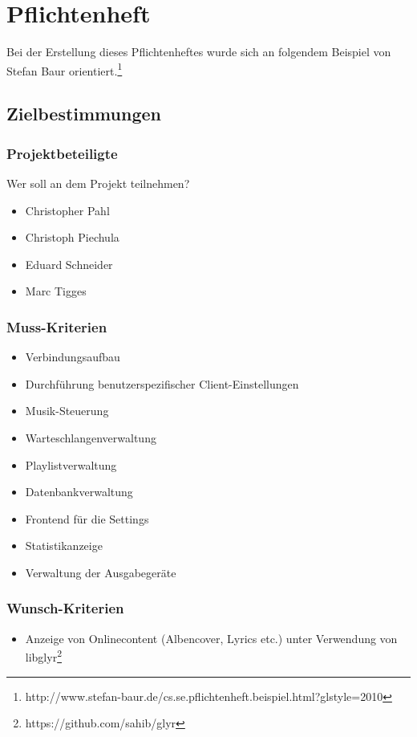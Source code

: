 \chapter{Pflichtenheft}
Bei der Erstellung dieses Pflichtenheftes wurde sich an folgendem Beispiel von Stefan Baur orientiert.\footnote{http://www.stefan-baur.de/cs.se.pflichtenheft.beispiel.html?glstyle=2010}

\section{Zielbestimmungen}
\subsection{Projektbeteiligte}
Wer soll an dem Projekt teilnehmen?
\begin{itemize}
        \item Christopher Pahl
        \item Christoph Piechula
        \item Eduard Schneider
        \item Marc Tigges
\end{itemize}
\subsection{Muss-Kriterien}
\renewcommand{\labelitemi}{•}
\begin{itemize}
	\item Verbindungsaufbau
	\item Durchführung benutzerspezifischer Client-Einstellungen
	\item Musik-Steuerung
	\item Warteschlangenverwaltung
	\item Playlistverwaltung
	\item Datenbankverwaltung
	\item Frontend für die Settings
	\item Statistikanzeige
	\item Verwaltung der Ausgabegeräte
\end{itemize}
\subsection{Wunsch-Kriterien}
\begin{itemize}
	\item Anzeige von Onlinecontent (Albencover, Lyrics etc.) unter Verwendung von libglyr\footnote{https://github.com/sahib/glyr}
\end{itemize}

